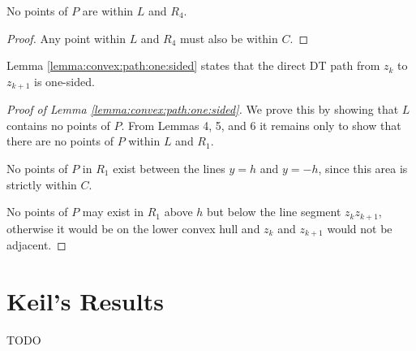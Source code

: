 \documentclass{tufte-handout}
\begin{document}
\begin{Note}

  No points of $P$ are within $L$ and $R_4$.
  
\end{Note}

\begin{proof}

  Any point within $L$ and $R_4$ must also be within $C$.

\end{proof}

Lemma \ref{lemma:convex:path:one:sided} states that the direct DT path
from $z_k$ to $z_{k+1}$ is one-sided.
  
\begin{proof}[Proof of Lemma \ref{lemma:convex:path:one:sided}]

  We prove this by showing that $L$ contains no points of $P$.  From
  Lemmas 4, 5, and 6 it remains only to show that there are no points
  of $P$ within $L$ and $R_1$.

  No points of $P$ in $R_1$ exist between the lines $y=h$ and $y=-h$,
  since this area is strictly within $C$.

  No points of $P$ may exist in $R_1$ above $h$ but below the line
  segment $z_kz_{k+1}$, otherwise it would be on the lower convex hull
  and $z_k$ and $z_{k+1}$ would not be adjacent.

\end{proof}

\newpage
\part{Keil's Results}

TODO


\newpage

\end{document}
